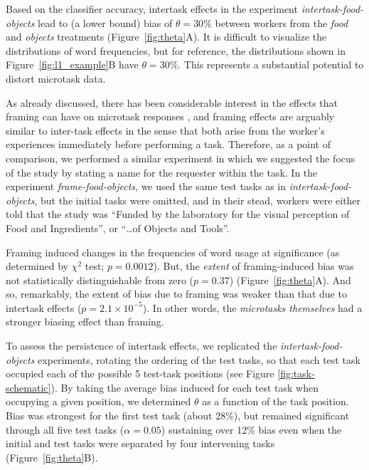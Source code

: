 \documentclass{sigchi}
\begin{document}
Based on the classifier accuracy, intertask effects in the 
experiment \textit{intertask-food-objects}
lead to (a lower bound) bias of $\theta=30\%$ between workers from the 
\textit{food} and \textit{objects} treatments (Figure~\ref{fig:theta}A).
It is difficult to visualize the distributions of word frequencies,
but for reference, the distributions shown in 
Figure~\ref{fig:l1_example}B have $\theta = 30\%$.  This represents a 
substantial potential to distort microtask data.

As already discussed, there has been considerable interest in the 
effects that framing can have on microtask responses
\cite{Kinnaird2012281,chandler2013breaking,thibodeau2013natural}, and 
framing effects are arguably similar to inter-task effects in the sense 
that both arise from the worker's experiences immediately before 
performing a task.
Therefore, as a point of comparison, we performed a similar experiment 
in which we suggested the focus of the study by stating a name for
the requester within the task.
In the experiment 
\textit{frame-food-objects}, we used the same test tasks as in 
\textit{intertask-food-objects}, but the initial tasks were omitted, 
and in their stead, workers were either told that the study was 
``Funded by the laboratory for the 
visual perception of Food and Ingredients'', 
or ``\ldots of Objects and Tools''.  

Framing induced changes in the frequencies of 
word usage at significance 
(as determined by $\chi^2$ test; $p=0.0012$).  But, 
the \textit{extent} of framing-induced bias was not statistically 
distinguishable from zero ($p =0.37$) (Figure~\ref{fig:theta}A).
And so, remarkably, the extent of bias due to framing was weaker than that 
due to intertask effects ($p=2.1\times 10^{-5}$).
In other words, the \textit{microtasks themselves}
had a stronger biasing effect than framing.

To assess the persistence of intertask effects, we replicated the 
\textit{intertask-food-objects} experiments, rotating the ordering of the
test tasks, so that each test task occupied each of the possible 5 
test-task positions (see Figure \ref{fig:task-schematic}).  
By taking the average bias induced for each test task when 
occupying a given position, we determined $\theta$ as a function of the 
task position.
Bias was strongest for the first test task (about 28\%), 
but remained significant through all five test tasks 
($\alpha=0.05$) sustaining over 12\% bias even when the initial and test 
tasks were separated by four intervening tasks (Figure~\ref{fig:theta}B).
\end{document}
